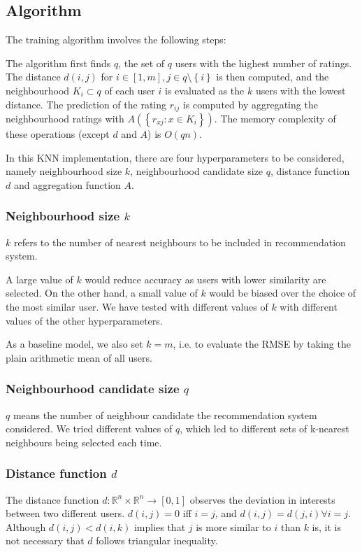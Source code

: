 \documentclass[final]{cvpr}
\newcommand{\Set}[1]{\left\{#1\right\}}
\begin{document}
\subsection{Algorithm}
The training algorithm involves the following steps:

The algorithm first finds $q$, the set of $q$ users with the highest number of ratings.
The distance $d(i, j)$ for $i \in [1, m], j \in q \setminus \Set{i}$ is then computed,
and the neighbourhood $K_i \subset q$ of each user $i$ is evaluated as the $k$ users with the lowest distance.
The prediction of the rating $r_{ij}$ is computed by
aggregating the neighbourhood ratings with $A(\Set{r_{xj} : x \in K_i})$.
The memory complexity of these operations (except $d$ and $A$) is $O(qn)$.

In this KNN implementation, there are four hyperparameters to be considered, namely neighbourhood size $k$, neighbourhood candidate size $q$, distance function $d$ and aggregation function $A$.

\subsubsection{Neighbourhood size $k$}
$k$ refers to the number of nearest neighbours to be included in recommendation system. 

A large value of $k$ would reduce accuracy as users with lower similarity are selected.
On the other hand, a small value of $k$ would be biased over the choice of the most similar user.
We have tested with different values of $k$ with different values of the other hyperparameters.

As a baseline model, we also set $k=m$, i.e.
to evaluate the RMSE by taking the plain arithmetic mean of all users.

\subsubsection{Neighbourhood candidate size $q$}
$q$ means the number of neighbour candidate the recommendation system considered. 
We tried different values of $q$, which led to different sets of k-nearest neighbours being selected each time.

\subsubsection{Distance function $d$}
The distance function $d: \mathbb R^n \times \mathbb R^n \to [0, 1]$
observes the deviation in interests between two different users.
$d(i, j) = 0$ iff $i = j$, and $d(i, j) = d(j, i) \forall i = j$.
Although $d(i, j) < d(i, k)$ implies that $j$ is more similar to $i$ than $k$ is,
it is not necessary that $d$ follows triangular inequality.
\end{document}
